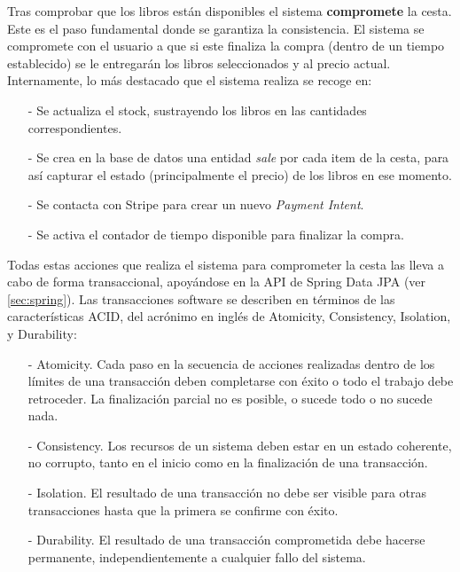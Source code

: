 \documentclass[a4paper]{article}
\begin{document}
    Tras comprobar que los libros están disponibles el sistema \textbf{compromete} la cesta. Este es el paso fundamental donde se garantiza la consistencia. El sistema se compromete con el usuario a que si este finaliza la compra (dentro de un tiempo establecido) se le entregarán los libros seleccionados y al precio actual. Internamente, lo más destacado que el sistema realiza se recoge en:
    
    \begin{itemize}
    	\item[-] Se actualiza el stock, sustrayendo los libros en las cantidades correspondientes.
    	\item[-] Se crea en la base de datos una entidad \emph{sale} por cada item de la cesta, para así capturar el estado (principalmente el precio) de los libros en ese momento.
    	\item[-] Se contacta con Stripe para crear un nuevo \emph{Payment Intent}.
    	\item[-] Se activa el contador de tiempo disponible para finalizar la compra.
    \end{itemize}
    
    Todas estas acciones que realiza el sistema para comprometer la cesta las lleva a cabo de forma transaccional, apoyándose en la API de Spring Data JPA (ver \ref{sec:spring}). Las transacciones software se describen en términos de las características ACID, del acrónimo en inglés de Atomicity, Consistency, Isolation, y Durability:
    
    \begin{itemize}
    	\item[-] Atomicity. Cada paso en la secuencia de acciones realizadas dentro de los límites de una transacción deben completarse con éxito o todo el trabajo debe
    	retroceder. La finalización parcial no es posible, o sucede todo o no sucede nada.
    	\item[-] Consistency. Los recursos de un sistema deben estar en un estado coherente, no corrupto, tanto en el inicio como en la finalización de una transacción.
    	\item[-] Isolation. El resultado de una transacción no debe ser visible para otras transacciones hasta que la primera se confirme con éxito.
    	\item[-] Durability. El resultado de una transacción comprometida debe hacerse permanente, independientemente a cualquier fallo del sistema.
    \end{itemize}
    
\end{document}
